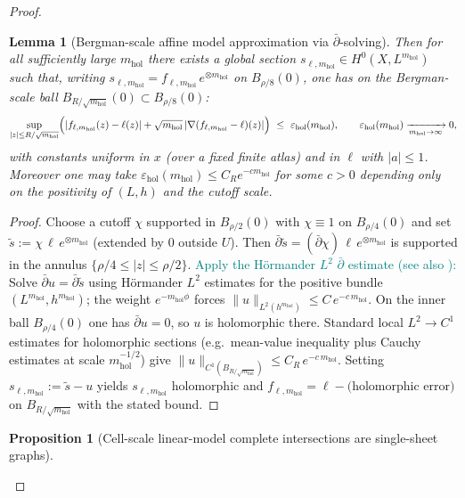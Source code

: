 \documentclass[11pt]{article}
\newcommand{\REVMZ}[1]{\textcolor{teal}{#1}}  %
\numberwithin{equation}{section}  %
\theoremstyle{plain}
\newtheorem{lemma}[theorem]{Lemma}
\newtheorem{proposition}[theorem]{Proposition}
\theoremstyle{definition}
\theoremstyle{remark}
\newcommand{\mhol}{m_{\mathrm{hol}}} %
\begin{document}
\begin{proof}
\begin{lemma}[Bergman-scale affine model approximation via $\bar\partial$-solving]
Then for all sufficiently large {$\mhol$} there exists a global section
{$s_{\ell,\mhol}\in H^0(X,L^{\mhol})$} such that, writing
{$s_{\ell,\mhol}=f_{\ell,\mhol}\,e^{\otimes \mhol}$} on $B_{\rho/8}(0)$, one has on the Bergman-scale ball
{$B_{R/\sqrt{\mhol}}(0)\subset B_{\rho/8}(0)$}:
\[
\sup_{|z|\le R/\sqrt{\mhol}}
\Bigl(|f_{\ell,\mhol}(z)-\ell(z)|+\sqrt{\mhol}\,|\nabla(f_{\ell,\mhol}-\ell)(z)|\Bigr)
\ \le\ {\varepsilon_{\mathrm{hol}}(\mhol)},
\qquad
{\varepsilon_{\mathrm{hol}}(\mhol)\xrightarrow[\mhol\to\infty]{}0},
\]
with constants uniform in $x$ (over a fixed finite atlas) and in $\ell$ with $|a|\le 1$.
{Moreover one may take $\varepsilon_{\mathrm{hol}}(\mhol)\le C_R e^{-c\mhol}$ for some $c>0$ depending only on the
positivity of $(L,h)$ and the cutoff scale.}
\end{lemma}

\begin{proof}
Choose a cutoff $\chi$ supported in $B_{\rho/2}(0)$ with $\chi\equiv 1$ on $B_{\rho/4}(0)$ and set
{$\tilde s:=\chi\,\ell\,e^{\otimes \mhol}$} (extended by $0$ outside $U$).
Then $\bar\partial\tilde s=(\bar\partial\chi)\,\ell\,{e^{\otimes \mhol}}$ is supported in the annulus
$\{\rho/4\le |z|\le \rho/2\}$.
\REVMZ{Apply the H\"ormander $L^2$ $\bar\partial$ estimate \cite[Thm~4.2.1]{Hormander65} (see also \cite[Ch.~VIII]{Demailly12}):}
Solve $\bar\partial u=\bar\partial\tilde s$ using H\"ormander $L^2$ estimates for the positive bundle
{$(L^{\mhol},h^{\mhol})$}; the weight $e^{-{\mhol}\phi}$ forces
$\|u\|_{L^2(h^{\mhol})}\le C\,e^{-c\,{\mhol}}$.
On the inner ball $B_{\rho/4}(0)$ one has $\bar\partial u=0$, so $u$ is holomorphic there.
Standard local $L^2\to C^1$ estimates for holomorphic sections
(e.g.\ mean-value inequality plus Cauchy estimates
 at scale ${\mhol^{-1/2}}$)
give $\|u\|_{C^1({B_{R/\sqrt{\mhol}}})}\le C_R\,e^{-c\,{\mhol}}$.
Setting {$s_{\ell,\mhol}:=\tilde s-u$} yields $s_{\ell,\mhol}$ holomorphic and
$f_{\ell,\mhol}=\ell-\text{(holomorphic error)}$ on ${B_{R/\sqrt{\mhol}}}$ with the stated bound.
\end{proof}



\begin{proposition}[Cell-scale linear-model complete intersections are single-sheet graphs]\label{prop:cell-scale-linear-model-graph}


\end{proposition}
\end{proof}
\end{document}
